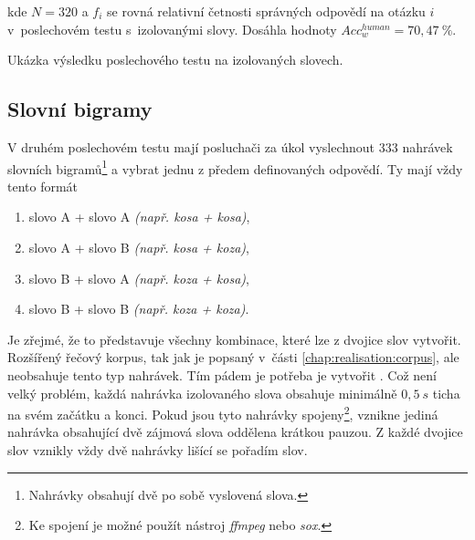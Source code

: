 \noindent kde $N=320$ a $f_i$ se rovná relativní četnosti správných odpovědí na otázku $i$ v~poslechovém testu s~izolovanými slovy. Dosáhla hodnoty $Acc_w^{human} = 70,47~\%$.

\begin{table}[htpb]
  \centering
  \def\arraystretch{1.5}
  \caption{Ukázka výsledku poslechového testu na izolovaných slovech.}
  \label{tab:realisation:listening:isolated}
\end{table}

\subsection{Slovní bigramy}
\label{chap:realisation:listening:bigrams}

V druhém poslechovém testu mají posluchači za úkol vyslechnout $333$ nahrávek slovních bigramů\footnote{Nahrávky obsahují dvě po sobě vyslovená slova.} a vybrat jednu z předem definovaných odpovědí. Ty mají vždy tento formát

\begin{enumerate}[label=\alph*)]
  \item slovo A + slovo A \textit{(např. kosa + kosa)},
  \item slovo A + slovo B \textit{(např. kosa + koza)},
  \item slovo B + slovo A \textit{(např. koza + kosa)},
  \item slovo B + slovo B \textit{(např. koza + koza)}.
\end{enumerate}

\noindent Je zřejmé, že to představuje všechny kombinace, které lze z dvojice slov vytvořit. Rozšířený řečový korpus, tak jak je popsaný v~části \ref{chap:realisation:corpus}, ale neobsahuje tento typ nahrávek. Tím pádem je potřeba je vytvořit . Což není velký problém, každá nahrávka izolovaného slova obsahuje minimálně $0,5\ s$ ticha na svém začátku a konci. Pokud jsou tyto nahrávky spojeny\footnote{Ke spojení je možné použít nástroj \textit{ffmpeg} nebo \textit{sox}.}, vznikne jediná nahrávka obsahující dvě zájmová slova oddělena krátkou pauzou. Z každé dvojice slov vznikly vždy dvě nahrávky lišící se pořadím slov.

